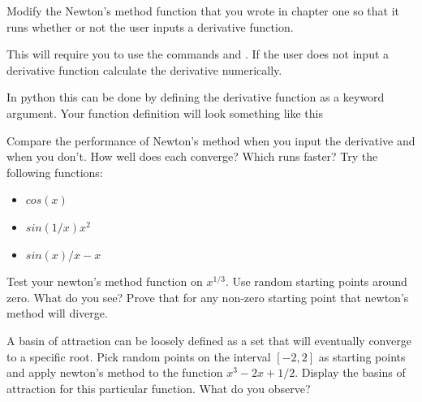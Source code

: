 \begin{problem}
Modify the Newton's method function that you wrote in chapter one so that it runs whether or not the user inputs a derivative function. \begin{matlab}This will require you to use the commands  and . If the user does not input a derivative function calculate the derivative numerically.\end{matlab}\begin{python}In python this can be done by defining the derivative function as a keyword argument.  Your function definition will look something like this \end{python}

Compare the performance of Newton's method when you input the derivative and when you don't. How well does each converge? Which runs faster? Try the following functions:

\begin{itemize}
\item $cos(x)$
\item $sin(1/x)x^2$
\item $sin(x)/x -x$
\end{itemize}



\end{problem}

\begin{problem}
Test your newton's method function on $x^{1/3}$. Use random starting points around zero. What do you see? Prove that for any non-zero starting point that newton's method will diverge.
\end{problem}

\begin{problem}
A basin of attraction can be loosely defined as a set that will eventually converge to a specific root. Pick random points on the interval $[-2,2]$ as starting points and apply newton's method to the function $x^3 -2x + 1/2$. Display the basins of attraction for this particular function. What do you observe?


\end{problem}

